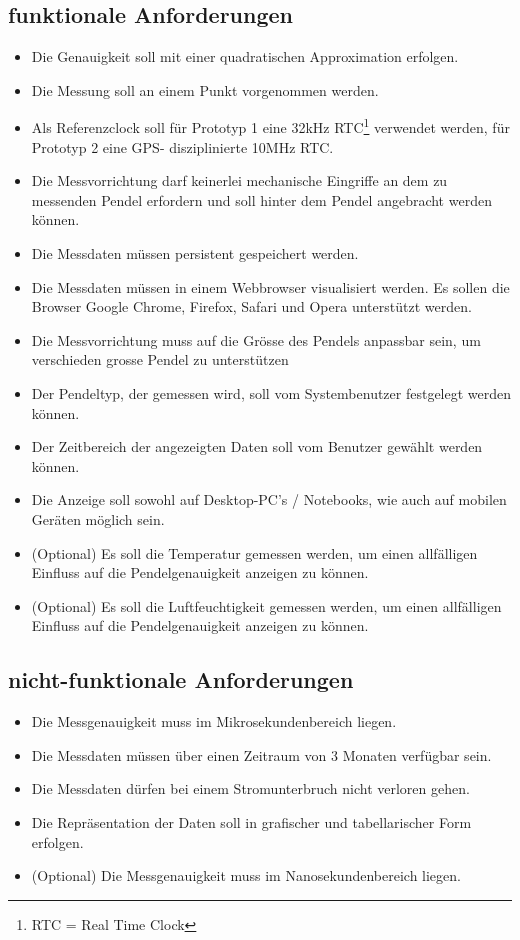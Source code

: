\subsection{funktionale Anforderungen}
	\begin{itemize}
        \item Die Genauigkeit soll mit einer quadratischen Approximation erfolgen.
        \item Die Messung soll an einem Punkt vorgenommen werden.
        \item Als Referenzclock soll für Prototyp 1 eine 32kHz RTC\footnote{RTC = Real Time Clock} verwendet werden, für Prototyp 2 eine GPS- disziplinierte 10MHz RTC.
        \item Die Messvorrichtung darf keinerlei mechanische Eingriffe an dem zu messenden Pendel erfordern und soll hinter dem Pendel angebracht werden können.%
        \item Die Messdaten müssen persistent gespeichert werden.
		\item Die Messdaten müssen in einem Webbrowser visualisiert werden. Es sollen die Browser Google Chrome, Firefox, Safari und Opera unterstützt werden.
		\item Die Messvorrichtung muss auf die Grösse des Pendels anpassbar sein, um verschieden grosse Pendel zu unterstützen
		\item Der Pendeltyp, der gemessen wird, soll vom Systembenutzer festgelegt werden können.
		\item Der Zeitbereich der angezeigten Daten soll vom Benutzer gewählt werden können.
		\item Die Anzeige soll sowohl auf Desktop-PC's / Notebooks, wie auch auf mobilen Geräten möglich sein.
        
		\item (Optional) Es soll die Temperatur gemessen werden, um einen allfälligen Einfluss auf die Pendelgenauigkeit anzeigen zu können.
        \item (Optional) Es soll die Luftfeuchtigkeit gemessen werden, um einen allfälligen Einfluss auf die Pendelgenauigkeit anzeigen zu können.
	\end{itemize}
\subsection{nicht-funktionale Anforderungen}
	\begin{itemize}
		\item Die Messgenauigkeit muss im Mikrosekundenbereich liegen.
        \item Die Messdaten müssen über einen Zeitraum von 3 Monaten verfügbar sein.
        \item Die Messdaten dürfen bei einem Stromunterbruch nicht verloren gehen.
		\item Die Repräsentation der Daten soll in grafischer und tabellarischer Form erfolgen.
        \item (Optional) Die Messgenauigkeit muss im Nanosekundenbereich liegen.
	\end{itemize}

